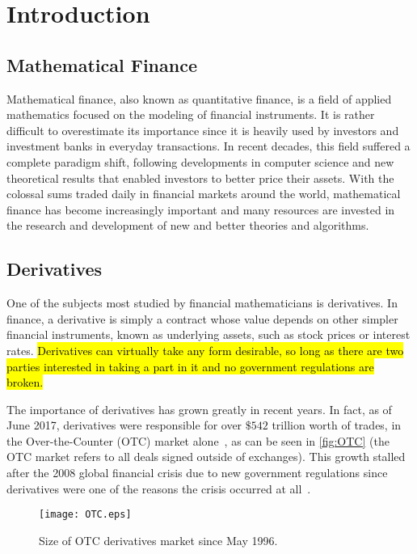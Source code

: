 \chapter{Introduction}
\label{chapter:introduction}
\section{Mathematical Finance}
\label{section:mathematical finance}
Mathematical finance, also known as quantitative finance, is a field of applied mathematics focused on the modeling of financial instruments.
It is rather difficult to overestimate its importance since it is heavily used by investors and investment banks in everyday transactions.
In recent decades, this field suffered a complete paradigm shift, following developments in computer science and new theoretical results that enabled investors to better price their assets.
With the colossal sums traded daily in financial markets around the world, mathematical finance has become increasingly important and many resources are invested in the research and development of new and better theories and algorithms.


\section{Derivatives}
\label{section:derivatives}
One of the subjects most studied by financial mathematicians is derivatives.
In finance, a derivative is simply a contract whose value depends on other simpler financial instruments, known as underlying assets, such as stock prices or interest rates.
\hl{Derivatives can virtually take any form desirable, so long as there are two parties interested in taking a part in it and no government regulations are broken.}


The importance of derivatives has grown greatly in recent years. In fact, as of June 2017, derivatives were responsible for over $\$542$ trillion worth of trades, in the Over-the-Counter (OTC) market alone~\cite{BIS}, as can be seen in \autoref{fig:OTC} (the OTC market refers to all deals signed outside of exchanges).
This growth stalled after the 2008 global financial crisis due to new government regulations since derivatives were one of the reasons the crisis occurred at all~\cite{FT}. 


\begin{figure}[!htb]
    \centering
      \texttt{[image: OTC.eps]}
      \caption{Size of OTC derivatives market since May 1996.}\label{fig:OTC}
    \end{figure}

